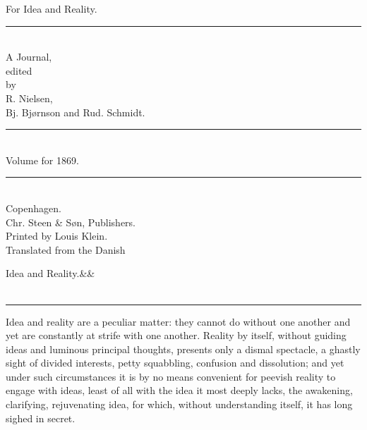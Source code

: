 \documentclass[12pt,a4paper,openany]{book}
\newcommand{\opage}[1]{\marginnote{\footnotesize\textit{[#1]}}}
\newcommand{\essayhead}[2]{\begin{center}{\large #1}\ifx&#2&\else\\[0.3em]{\normalsize #2}\fi\\[0.5em]\rule{3em}{0.4pt}\end{center}\medskip\noindent}
\begin{document}
\begin{titlepage}
\begin{center}
\vspace*{3em}
{\Huge For Idea and Reality.}\\[1em]
\rule{8em}{0.4pt}\\[1em]
{\large A Journal,}\\[0.8em]
{\small edited}\\[0.4em]
{\footnotesize by}\\[0.6em]
{\large R. Nielsen,}\\[0.4em]
{\large Bj. Bjørnson and Rud. Schmidt.}\\[1em]
\rule{8em}{0.4pt}\\[1em]
{\large Volume for 1869.}\\[1em]
\rule{8em}{0.4pt}\\[4em]
Copenhagen.\\[0.4em]
Chr. Steen \& Søn, Publishers.\\[1.5em]
{\small Printed by Louis Klein.}\\[3em]
{\small Translated from the Danish}
\end{center}
\end{titlepage}

\essayhead{Idea and Reality.}{}
\setcounter{footnote}{0}%
\opage{1}Idea and reality are a peculiar matter: they cannot
do without one another and yet are constantly at strife
with one another. Reality by itself, without guiding ideas
and luminous principal thoughts, presents only a dismal
spectacle, a ghastly sight of divided interests, petty
squabbling, confusion and dissolution; and yet under such
circumstances it is by no means convenient for peevish reality
to engage with ideas, least of all with
the idea it most deeply lacks, the awakening, clarifying, rejuvenating
idea, for which, without understanding itself,
it has long sighed in secret.
\end{document}
